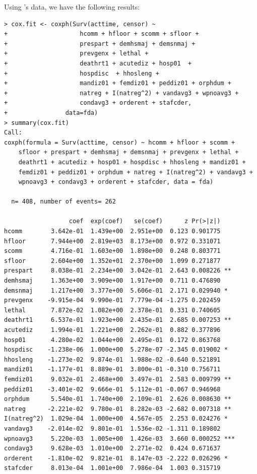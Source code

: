 Using \citet{keele2010proportionally}'s data, we have the following results:

\begin{lstlisting}
> cox.fit <- coxph(Surv(acttime, censor) ~ 
+                    hcomm + hfloor + scomm + sfloor + 
+                    prespart + demhsmaj + demsnmaj + 
+                    prevgenx + lethal + 
+                    deathrt1 + acutediz + hosp01  + 
+                    hospdisc  + hhosleng + 
+                    mandiz01 + femdiz01 + peddiz01 + orphdum + 
+                    natreg + I(natreg^2) + vandavg3 + wpnoavg3 + 
+                    condavg3 + orderent + stafcder, 
+                data=fda)
> summary(cox.fit)
Call:
coxph(formula = Surv(acttime, censor) ~ hcomm + hfloor + scomm + 
    sfloor + prespart + demhsmaj + demsnmaj + prevgenx + lethal + 
    deathrt1 + acutediz + hosp01 + hospdisc + hhosleng + mandiz01 + 
    femdiz01 + peddiz01 + orphdum + natreg + I(natreg^2) + vandavg3 + 
    wpnoavg3 + condavg3 + orderent + stafcder, data = fda)

  n= 408, number of events= 262 

                  coef  exp(coef)   se(coef)      z Pr(>|z|)    
hcomm        3.642e-01  1.439e+00  2.951e+00  0.123 0.901775    
hfloor       7.944e+00  2.819e+03  8.173e+00  0.972 0.331071    
scomm        4.716e-01  1.603e+00  1.898e+00  0.248 0.803771    
sfloor       2.604e+00  1.352e+01  2.370e+00  1.099 0.271877    
prespart     8.038e-01  2.234e+00  3.042e-01  2.643 0.008226 ** 
demhsmaj     1.363e+00  3.909e+00  1.917e+00  0.711 0.476890    
demsnmaj     1.217e+00  3.377e+00  5.606e-01  2.171 0.029940 *  
prevgenx    -9.915e-04  9.990e-01  7.779e-04 -1.275 0.202459    
lethal       7.872e-02  1.082e+00  2.378e-01  0.331 0.740605    
deathrt1     6.537e-01  1.923e+00  2.435e-01  2.685 0.007253 ** 
acutediz     1.994e-01  1.221e+00  2.262e-01  0.882 0.377896    
hosp01       4.280e-02  1.044e+00  2.495e-01  0.172 0.863768    
hospdisc    -1.238e-06  1.000e+00  5.278e-07 -2.345 0.019002 *  
hhosleng    -1.273e-02  9.874e-01  1.988e-02 -0.640 0.521891    
mandiz01    -1.177e-01  8.889e-01  3.800e-01 -0.310 0.756711    
femdiz01     9.032e-01  2.468e+00  3.497e-01  2.583 0.009799 ** 
peddiz01    -3.401e-02  9.666e-01  5.112e-01 -0.067 0.946968    
orphdum      5.540e-01  1.740e+00  2.109e-01  2.626 0.008630 ** 
natreg      -2.221e-02  9.780e-01  8.282e-03 -2.682 0.007318 ** 
I(natreg^2)  1.029e-04  1.000e+00  4.567e-05  2.253 0.024276 *  
vandavg3    -2.014e-02  9.801e-01  1.536e-02 -1.311 0.189802    
wpnoavg3     5.220e-03  1.005e+00  1.426e-03  3.660 0.000252 ***
condavg3     9.628e-03  1.010e+00  2.271e-02  0.424 0.671637    
orderent    -1.810e-02  9.821e-01  8.147e-03 -2.222 0.026296 *  
stafcder     8.013e-04  1.001e+00  7.986e-04  1.003 0.315719    
\end{lstlisting}





